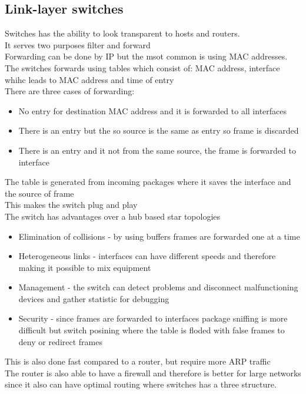 \documentclass[12pt, a4paper]{article}
\begin{document}
		\subsection{Link-layer switches}
			Switches has the ability to look transparent to hosts and routers.\\
			It serves two purposes filter and forward\\
			Forwarding can be done by IP but the msot common is using MAC addresses.\\
			The switches forwards using tables which consist of: MAC address, interface whihc leads to MAC address and time of entry\\
			There are three cases of forwarding:
			\begin{itemize}
				\item No entry for destination MAC address and it is forwarded to all interfaces
				\item There is an entry but the so source is the same as entry so frame is discarded
				\item There is an entry and it not from the same source, the frame is forwarded to interface
			\end{itemize}
			The table is generated from incoming packages where it saves the interface and the source of frame\\
			This makes the switch plug and play\\
			The switch has advantages over a hub based star topologies 
			\begin{itemize}
				\item Elimination of collisions - by using buffers frames are forwarded one at a time
				\item Heterogeneous links - interfaces can have different speeds and therefore making it possible to mix equipment
				\item Management - the switch can detect problems and disconnect malfunctioning devices and gather statistic for debugging
				\item Security - since frames are forwarded to interfaces package sniffing is more difficult but switch posining where the table is floded with false frames to deny or redirect frames
			\end{itemize}
			This is also done fast compared to a router, but require more ARP traffic\\
			The router is also able to have a firewall and therefore is better for large networks since it also can have optimal routing where switches has a three structure.\\
\end{document}
